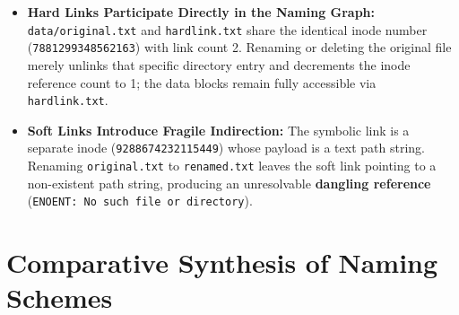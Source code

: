 \documentclass[11pt,a4paper]{article}
\begin{document}
\begin{solutionbox}
\begin{itemize}[leftmargin=*,itemsep=1pt]
  \item \textbf{Hard Links Participate Directly in the Naming Graph:} \texttt{data/original.txt} and \texttt{hardlink.txt} share the identical inode number (\texttt{7881299348562163}) with link count 2. Renaming or deleting the original file merely unlinks that specific directory entry and decrements the inode reference count to 1; the data blocks remain fully accessible via \texttt{hardlink.txt}.
  \item \textbf{Soft Links Introduce Fragile Indirection:} The symbolic link is a separate inode (\texttt{9288674232115449}) whose payload is a text path string. Renaming \texttt{original.txt} to \texttt{renamed.txt} leaves the soft link pointing to a non-existent path string, producing an unresolvable \textbf{dangling reference} (\texttt{ENOENT: No such file or directory}).
\end{itemize}
\end{solutionbox}

\section{Comparative Synthesis of Naming Schemes}
\end{document}
